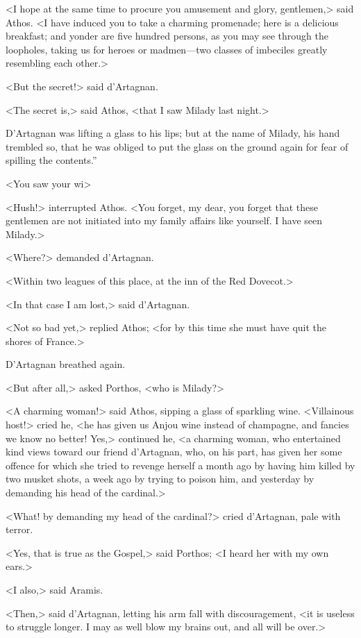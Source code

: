 <I hope at the same time to procure you amusement and glory, gentlemen,> said Athos. <I have induced you to take a charming promenade; here is a delicious breakfast; and yonder are five hundred persons, as you may see through the loopholes, taking us for heroes or madmen---two classes of imbeciles greatly resembling each other.> 

<But the secret!> said d'Artagnan. 

<The secret is,> said Athos, <that I saw Milady last night.> 

D'Artagnan was lifting a glass to his lips; but at the name of Milady, his hand trembled so, that he was obliged to put the glass on the ground again for fear of spilling the contents.” 

<You saw your wi\longdash> 

<Hush!> interrupted Athos. <You forget, my dear, you forget that these gentlemen are not initiated into my family affairs like yourself. I have seen Milady.> 

<Where?> demanded d'Artagnan. 

<Within two leagues of this place, at the inn of the Red Dovecot.> 

<In that case I am lost,> said d'Artagnan. 

<Not so bad yet,> replied Athos; <for by this time she must have quit the shores of France.> 

D'Artagnan breathed again. 

<But after all,> asked Porthos, <who is Milady?> 

<A charming woman!> said Athos, sipping a glass of sparkling wine. <Villainous host!> cried he, <he has given us Anjou wine instead of champagne, and fancies we know no better! Yes,> continued he, <a charming woman, who entertained kind views toward our friend d'Artagnan, who, on his part, has given her some offence for which she tried to revenge herself a month ago by having him killed by two musket shots, a week ago by trying to poison him, and yesterday by demanding his head of the cardinal.> 

<What! by demanding my head of the cardinal?> cried d'Artagnan, pale with terror. 

<Yes, that is true as the Gospel,> said Porthos; <I heard her with my own ears.> 

<I also,> said Aramis. 

<Then,> said d'Artagnan, letting his arm fall with discouragement, <it is useless to struggle longer. I may as well blow my brains out, and all will be over.> 

